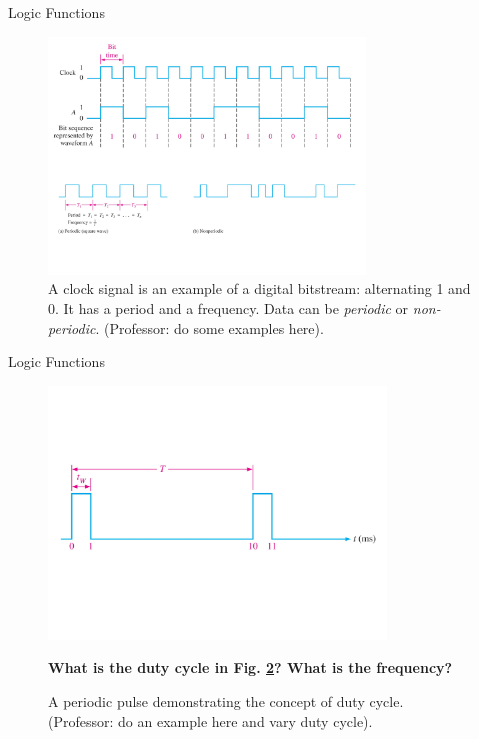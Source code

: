 \documentclass{beamer}
\begin{document}
\begin{frame}{Logic Functions}
\begin{figure}
\includegraphics[width=0.75\textwidth]{digital2.pdf}
\caption{\label{fig:digital2} A clock signal is an example of a digital bitstream: alternating 1 and 0.  It has a period and a frequency.  Data can be \textit{periodic} or \textit{non-periodic}. (Professor: do some examples here).}
\end{figure}
\end{frame}

\begin{frame}{Logic Functions}
\begin{figure}
\includegraphics[width=0.8\textwidth,trim=0cm 4cm 0cm 4cm,clip=true]{digital3.pdf}
\caption{\label{fig:digital3} A periodic pulse demonstrating the concept of duty cycle. (Professor: do an example here and vary duty cycle).}
\textbf{What is the duty cycle in Fig. \ref{fig:digital3}?  What is the frequency?}
\end{figure}
\end{frame}
\end{document}
